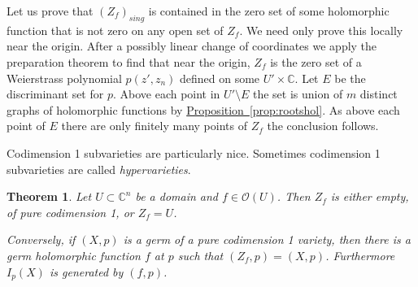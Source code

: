 \documentclass[12pt,openany]{book}
\newcommand{\C}{{\mathbb{C}}}
\newcommand{\sO}{{\mathcal{O}}}
\newcommand{\myindex}[1]{#1\index{#1}}
\theoremstyle{plain}
\newtheorem{thm}{Theorem}[section]
\theoremstyle{remark}
\theoremstyle{definition}
\theoremstyle{exercise}
\theoremstyle{example}
\newcommand{\propref}[1]{\hyperref[#1]{Proposition~\ref*{#1}}}
\begin{document}
Let us prove that $(Z_f)_{\mathit{sing}}$ is contained in the zero set of some holomorphic
function that is not zero on any open set of $Z_f$.
%
We need only prove this locally near the origin.  After a possibly
linear change of coordinates we apply the preparation theorem to find
that near the origin, $Z_f$ is the zero set of a Weierstrass polynomial
$p(z',z_n)$ defined on some $U' \times \C$.
Let $E$ be the discriminant set for $p$.  Above each
point in $U' \setminus E$ the set is union of $m$ distinct graphs
of holomorphic functions by \propref{prop:rootshol}.  As above
each point of $E$ there are only finitely many points of $Z_f$ the conclusion
follows.

%


Codimension 1 subvarieties are particularly nice.  Sometimes codimension 1
subvarieties are called \emph{\myindex{hypervarieties}}.

\begin{thm} \label{thm:codim1var}
Let $U \subset \C^n$ be a domain and $f \in \sO(U)$.
Then $Z_f$ is either empty, of pure codimension 1, or $Z_f = U$.

Conversely, if $(X,p)$ is a germ of a pure codimension 1 variety, then
there is a germ holomorphic function $f$ at $p$
such that $(Z_f,p) = (X,p)$.  Furthermore $I_p(X)$ is generated by $(f,p)$.
\end{thm}
\end{document}
